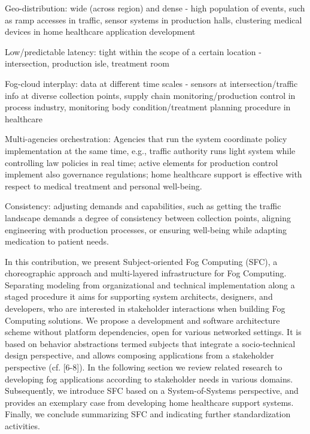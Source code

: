 \begin{list}{-}{spacing}
	\item Geo-distribution: wide (across region) and dense - high population of events, such as ramp accesses in traffic, sensor systems in production halls, clustering medical devices in home healthcare application development
	\item Low/predictable latency: tight within the scope of a certain location - intersection, production isle, treatment room
	\item Fog-cloud interplay: data at different time scales - sensors at intersection/traffic info at diverse collection points, supply chain monitoring/production control in process industry, monitoring body condition/treatment planning procedure in healthcare
	\item Multi-agencies orchestration: Agencies that run the system coordinate policy implementation at the same time, e.g., traffic authority runs light system while controlling law policies in real time; active elements for production control implement also governance regulations; home healthcare support is effective with respect to medical treatment and personal well-being.
	\item Consistency: adjusting demands and capabilities, such as getting the traffic landscape demands a degree of consistency between collection points, aligning engineering with production processes, or ensuring well-being while adapting medication to patient needs.
\end{list}

In this contribution, we present Subject-oriented Fog Computing (SFC), a choreographic approach and multi-layered infrastructure for Fog Computing. Separating modeling from organizational and technical implementation along a staged procedure it aims for supporting system architects, designers, and developers, who are interested in stakeholder interactions when building Fog Computing solutions. We propose a development and software architecture scheme without platform dependencies, open for various networked settings. It is based on behavior abstractions termed subjects that integrate a socio-technical design perspective, and allows composing applications from a stakeholder perspective (cf. [6-8]).
In the following section we review related research to developing fog applications according to stakeholder needs in various domains. Subsequently, we introduce SFC based on a System-of-Systems perspective, and provides an exemplary case from developing home healthcare support systems. Finally, we conclude summarizing SFC and indicating further standardization activities. 

